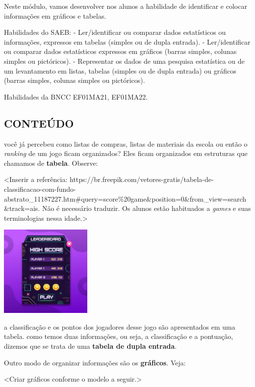 Neste módulo, vamos desenvolver nos alunos a habilidade de identificar e
colocar informações em gráficos e tabelas.

Habilidades do SAEB:
- Ler/identificar ou comparar dados estatísticos ou informações,
expressos em tabelas (simples ou de dupla entrada).
- Ler/identificar ou comparar dados estatísticos expressos em gráficos
(barras simples, colunas simples ou pictóricos).
- Representar os dados de uma pesquisa estatística ou de um levantamento
em listas, tabelas (simples ou de dupla entrada) ou gráficos (barras
simples, colunas simples ou pictóricos).

Habilidades da BNCC
EF01MA21, EF01MA22.

\subsection{CONTEÚDO}\label{conteuxfado-6}

você já percebeu como listas
de compras, listas de materiais da escola ou então o
\emph{ranking} de um jogo ficam organizados? Eles ficam organizados em estruturas que chamamos de \textbf{tabela}. Observe:

\textless{}Inserir a referência:
https://br.freepik.com/vetores-gratis/tabela-de-classificacao-com-fundo-abstrato\_11187227.htm\#query=score\%20game\&position=0\&from\_view=search\&track=ais.
Não é necessário traduzir. Os alunos estão habituados a \emph{games} e
suas terminologias nessa idade.\textgreater{}

\includegraphics[width=1.77083in,height=1.77083in]{media/image93.jpg}

a classificação e os pontos dos jogadores desse jogo são apresentados em
uma tabela. como temos duas informações, ou seja, a classificação e a
pontuação, dizemos que se trata de uma \textbf{tabela de dupla entrada}.

Outro modo de organizar informações são os \textbf{gráficos}. Veja:

\textless{}Criar gráficos conforme o modelo a seguir.\textgreater{}

